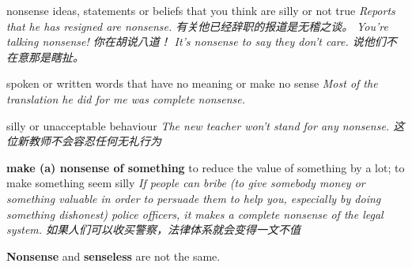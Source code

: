 \begin{DefWord}{nonsense}
    ideas, statements or beliefs that you think are silly or not true
    \textit{Reports that he has resigned are nonsense. 有关他已经辞职的报道是无稽之谈。}
    \textit{You're talking nonsense! 你在胡说八道！}
    \textit{It's nonsense to say they don't care. 说他们不在意那是瞎扯。}

    spoken or written words that have no meaning or make no sense
    \textit{Most of the translation he did for me was complete nonsense.}

    silly or unacceptable behaviour
    \textit{The new teacher won't stand for any nonsense. 这位新教师不会容忍任何无礼行为}

    \textbf{make (a) nonsense of something}
    to reduce the value of something by a lot; to make something seem silly
    \textit{If people can bribe (to give somebody money or something valuable in order to persuade them to help you, especially by doing something dishonest) police officers, it makes a complete nonsense of the legal system. 如果人们可以收买警察，法律体系就会变得一文不值}
\end{DefWord}

\begin{remark}
    \textbf{Nonsense} and \textbf{senseless} are not the same.
\end{remark}

